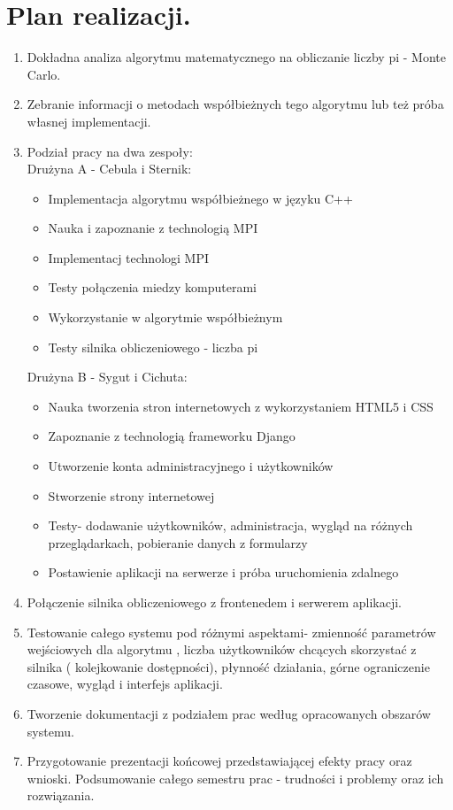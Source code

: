\documentclass[a4paper,12pt]{article}		%
\begin{document}
\section{Plan realizacji.}

\begin{enumerate}
\item Dokładna analiza algorytmu matematycznego na obliczanie liczby pi - Monte Carlo.
\item Zebranie informacji o metodach współbieżnych tego algorytmu lub też próba własnej implementacji.
\item Podział pracy na dwa zespoły:\\
Drużyna A - Cebula i Sternik:

\begin{itemize}
\item Implementacja algorytmu współbieżnego w języku C++
\item Nauka i zapoznanie z technologią MPI
\item Implementacj technologi MPI
\item Testy połączenia miedzy komputerami
\item Wykorzystanie w algorytmie współbieżnym
\item Testy silnika obliczeniowego - liczba pi
\end{itemize}

Drużyna B - Sygut i Cichuta:

\begin{itemize}
\item Nauka tworzenia stron internetowych z wykorzystaniem HTML5 i CSS
\item Zapoznanie z technologią frameworku Django
\item Utworzenie konta administracyjnego i użytkowników
\item Stworzenie strony internetowej
\item Testy- dodawanie użytkowników, administracja, wygląd na różnych przeglądarkach, pobieranie danych z formularzy
\item Postawienie aplikacji na serwerze i próba uruchomienia zdalnego
\end{itemize}

\item Połączenie silnika obliczeniowego z frontenedem i serwerem aplikacji.
\item Testowanie całego systemu pod różnymi aspektami- zmienność parametrów wejściowych dla algorytmu , liczba użytkowników chcących skorzystać z silnika ( kolejkowanie dostępności), płynność działania, górne ograniczenie czasowe, wygląd i interfejs aplikacji.
\item Tworzenie dokumentacji z podziałem prac według opracowanych obszarów systemu.
\item Przygotowanie prezentacji końcowej przedstawiającej efekty pracy oraz wnioski. Podsumowanie całego semestru prac - trudności i problemy oraz ich rozwiązania.
\end{enumerate}
\end{document}
